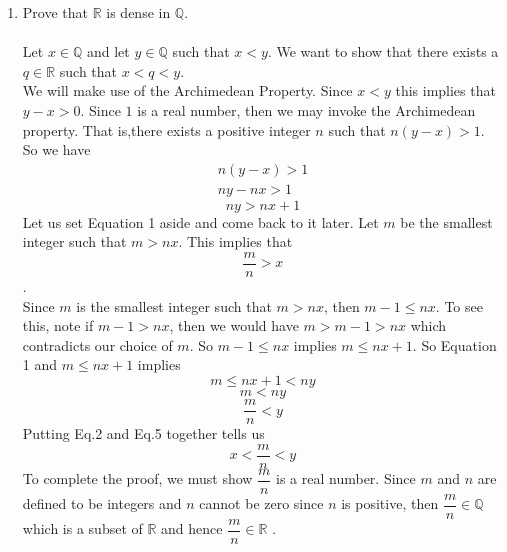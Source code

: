 \documentclass[12pt]{article}
\begin{document}
\begin{enumerate}
\item Prove that $\mathbb{R}$ is dense in $\mathbb{Q}$. \\ \\
Let $x \in \mathbb{Q}$ and let $y \in \mathbb{Q}$ such that $x<y$. We want to show that there exists a $q \in \mathbb{R}$ such that $x<q<y$. \\
We will make use of the Archimedean Property. Since $x<y$ this implies that $y-x>0$. Since $1$ is a real number, then we may invoke the Archimedean property. That is,there exists a positive integer $n$ such that $n(y-x)>1$. So we have
\begin{align*}
n(y-x)>1 \\
ny-nx>1
\end{align*} \begin{equation}
ny>nx+1
\end{equation}
Let us set Equation 1 aside and come back to it later. Let $m$ be the smallest integer such that $m>nx$. This implies that \begin{equation}
\dfrac{m}{n} > x
\end{equation}. \\

Since $m$ is the smallest integer such that $m>nx$, then $m-1 \leq nx$. To see this, note if $m-1 > nx$, then we would have $m> m-1 > nx$ which contradicts our choice of $m$. So $m-1 \leq nx$ implies $m \leq nx+1$. So Equation 1 and $m \leq nx+1$ implies
\begin{equation}
m \leq nx+1 < ny 
\end{equation}
\begin{equation}
m < ny 
\end{equation}
\begin{equation}
\dfrac{m}{n} < y
\end{equation}
Putting Eq.2 and Eq.5 together tells us
\begin{equation}
x < \dfrac{m}{n} < y 
\end{equation}
To complete the proof, we must show $\dfrac{m}{n}$ is a real number. Since $m$ and $n$ are defined to be integers and $n$ cannot be zero since $n$ is positive, then $\dfrac{m}{n} \in \mathbb{Q}$ which is a subset of $\mathbb{R}$ and hence $\dfrac{m}{n} \in \mathbb{R}$ .

\end{enumerate}
\end{document}
